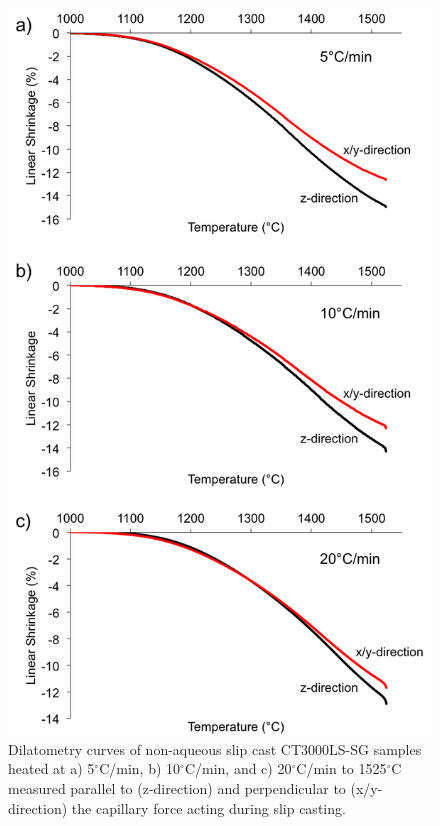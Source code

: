 \newpage
\begin{figure}[H]
	\centering
	\includegraphics[scale=0.80]{Chapter-6/Figures/Figure1.png}
	\caption{Dilatometry curves of non-aqueous slip cast CT3000LS-SG samples heated at a) 5$^{\circ}$C/min, b) 10$^{\circ}$C/min, and c) 20$^{\circ}$C/min to 1525$^{\circ}$C measured parallel to (z-direction) and perpendicular to (x/y-direction) the capillary force acting during slip casting.}
	\label{Ch6-figure:Figure1}
\end{figure}

